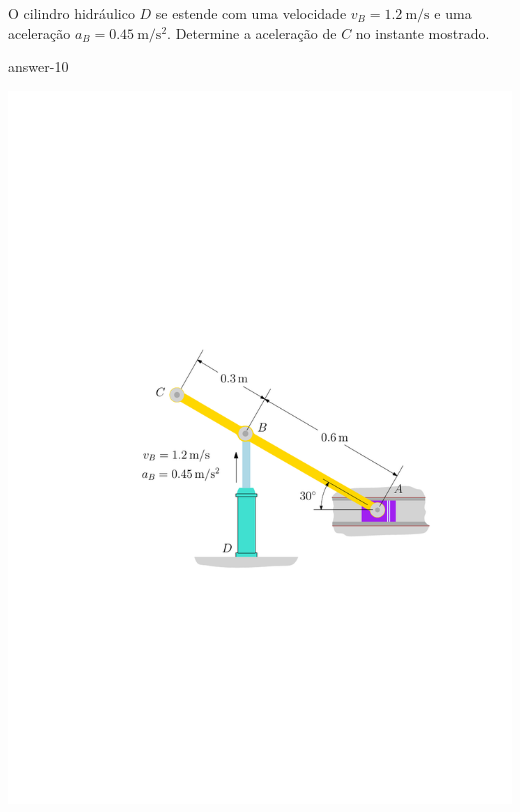 \item O cilindro hidráulico $D$ se estende com uma velocidade $v_{B}=\SI{1.2}{\meter/\second}$ e uma aceleração $a_{B}=\SI{0.45}{\meter/\second^{2}}$. Determine a aceleração de $C$ no instante mostrado.

{answer-10}

\vspace{-1.5cm}
\begin{flushleft}
	\includegraphics[scale=.95]{images/draw_11}
\end{flushleft}